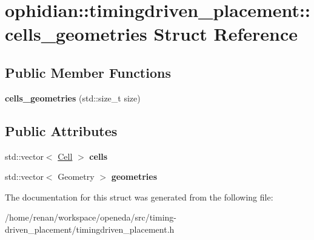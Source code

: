 \hypertarget{structophidian_1_1timingdriven__placement_1_1cells__geometries}{\section{ophidian\-:\-:timingdriven\-\_\-placement\-:\-:cells\-\_\-geometries Struct Reference}
\label{structophidian_1_1timingdriven__placement_1_1cells__geometries}
}
\subsection*{Public Member Functions}
\begin{DoxyCompactItemize}
\item 
\hypertarget{structophidian_1_1timingdriven__placement_1_1cells__geometries_ae235699810e7d8d4f6fa57e509bccfe8}{{\bfseries cells\-\_\-geometries} (std\-::size\-\_\-t size)}\label{structophidian_1_1timingdriven__placement_1_1cells__geometries_ae235699810e7d8d4f6fa57e509bccfe8}

\end{DoxyCompactItemize}
\subsection*{Public Attributes}
\begin{DoxyCompactItemize}
\item 
\hypertarget{structophidian_1_1timingdriven__placement_1_1cells__geometries_aee99e9ac21812588671789e318d3b461}{std\-::vector$<$ \hyperlink{classophidian_1_1entity_1_1entity}{Cell} $>$ {\bfseries cells}}\label{structophidian_1_1timingdriven__placement_1_1cells__geometries_aee99e9ac21812588671789e318d3b461}

\item 
\hypertarget{structophidian_1_1timingdriven__placement_1_1cells__geometries_ab4cdf584efb87caf2d5e636ed9f29174}{std\-::vector$<$ Geometry $>$ {\bfseries geometries}}\label{structophidian_1_1timingdriven__placement_1_1cells__geometries_ab4cdf584efb87caf2d5e636ed9f29174}

\end{DoxyCompactItemize}


The documentation for this struct was generated from the following file\-:\begin{DoxyCompactItemize}
\item 
/home/renan/workspace/openeda/src/timing-\/driven\-\_\-placement/timingdriven\-\_\-placement.\-h\end{DoxyCompactItemize}
